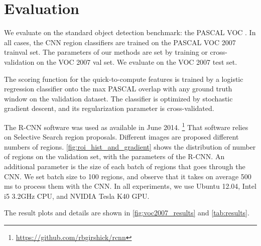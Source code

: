 \section{Evaluation}\label{sec:evaluation}

We evaluate on the standard object detection benchmark: the PASCAL VOC \cite{pascal-voc-2010}.
In all cases, the CNN region classifiers are trained on the PASCAL VOC 2007 trainval set.
The parameters of our methods are set by training or cross-validation on the VOC 2007 val set.
We evaluate on the VOC 2007 test set.

The scoring function for the quick-to-compute features is trained by a logistic regression classifier onto the max PASCAL overlap with any ground truth window on the validation dataset.
The classifier is optimized by stochastic gradient descent, and its regularization parameter is cross-validated.

The R-CNN software was used as available in June 2014.
\footnote{\url{https://github.com/rbgirshick/rcnn}}
That software relies on Selective Search \cite{Uijlings-IJCV-2013} region proposals.
Different images are proposed different numbers of regions.
\autoref{fig:roi_hist_and_gradient} shows the distribution of number of regions on the validation set, with the parameters of the R-CNN.
An additional parameter is the size of each batch of regions that goes through the CNN.
We set batch size to 100 regions, and observe that it takes on average 500 ms to process them with the CNN.
In all experiments, we use Ubuntu 12.04, Intel i5 3.2GHz CPU, and NVIDIA Tesla K40 GPU.

The result plots and details are shown in \autoref{fig:voc2007_results} and \autoref{tab:results}.





